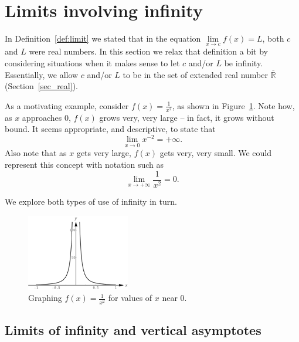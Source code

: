 \fi



\section{Limits involving infinity}\label{sec:limits_infty}

In Definition~\ref{def:limit} we stated that in the equation $\lim\limits_{x\to c}f(x) = L$, both $c$ and $L$ were real numbers. In this section we relax that definition a bit by considering situations when it makes sense to let $c$ and/or $L$ be infinity. Essentially, we allow $c$ and/or $L$ to be in the set of extended real number $\overline{\mathbb{R}}$ (Section~\ref{sec_real}). 

As a motivating example, consider $f(x) = \frac{1}{x^2}$, as shown in Figure~\ref{fig_lim_19}. Note how, as $x$ approaches 0, $f(x)$ grows very, very large -- in fact, it grows without bound. It seems appropriate, and descriptive, to state that $$\lim_{x\rightarrow 0} x^{-2}=+\infty.$$ Also note that as $x$ gets very large, $f(x)$ gets very, very small. We could represent this concept with notation such as $$\lim_{x\rightarrow +\infty} \frac1{x^2}=0.$$


We explore both types of use of infinity in turn.

\begin{figure}[H]
	\begin{center}
			\includegraphics[width=0.4\textwidth]{fig_lim_19}
	\caption{Graphing $f(x) = \frac{1}{x^2}$ for values of $x$ near 0. }
	\label{fig_lim_19}
	\end{center}
\end{figure}


\subsection{Limits of infinity and vertical asymptotes}




